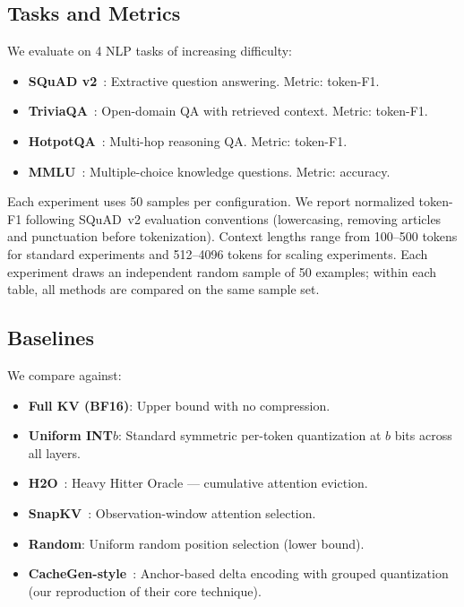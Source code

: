 \documentclass[conference]{IEEEtran}
\begin{document}
\subsection{Tasks and Metrics}

We evaluate on 4 NLP tasks of increasing difficulty:

\begin{itemize}
    \item \textbf{SQuAD v2}~\cite{squad}: Extractive question answering. Metric: token-F1.
    \item \textbf{TriviaQA}~\cite{triviaqa}: Open-domain QA with retrieved context. Metric: token-F1.
    \item \textbf{HotpotQA}~\cite{hotpotqa}: Multi-hop reasoning QA. Metric: token-F1.
    \item \textbf{MMLU}~\cite{mmlu}: Multiple-choice knowledge questions. Metric: accuracy.
\end{itemize}

Each experiment uses 50 samples per configuration.
We report normalized token-F1 following SQuAD~v2 evaluation conventions (lowercasing, removing articles and punctuation before tokenization).
Context lengths range from 100--500 tokens for standard experiments and 512--4096 tokens for scaling experiments.
Each experiment draws an independent random sample of 50 examples; within each table, all methods are compared on the same sample set.

\subsection{Baselines}

We compare against:
\begin{itemize}
    \item \textbf{Full KV (BF16)}: Upper bound with no compression.
    \item \textbf{Uniform INT$b$}: Standard symmetric per-token quantization at $b$ bits across all layers.
    \item \textbf{H2O}~\cite{h2o}: Heavy Hitter Oracle --- cumulative attention eviction.
    \item \textbf{SnapKV}~\cite{snapkv}: Observation-window attention selection.
    \item \textbf{Random}: Uniform random position selection (lower bound).
    \item \textbf{CacheGen-style}~\cite{cachegen}: Anchor-based delta encoding with grouped quantization (our reproduction of their core technique).
\end{itemize}
\end{document}
